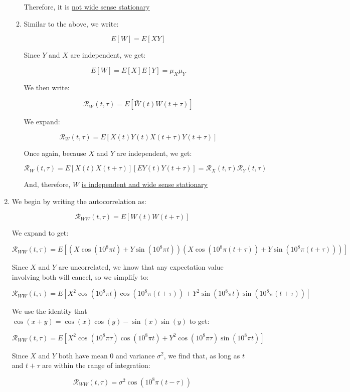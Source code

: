 \begin{enumerate}
\begin{enumerate}
        Therefore, it is \underline{not wide sense stationary}

      \item Similar to the above, we write:

        $$E[W]=E[XY]$$

        Since $Y$ and $X$ are independent, we get:

        $$E[W]=E[X]E[Y]=\mu_X\mu_Y$$

        We then write:

        $$\mathcal{R}_W(t,\tau)=E[\bar{W}(t)W(t+\tau)]$$

        We expand:

        $$\mathcal{R}_W(t,\tau)=E[X(t)Y(t)X(t+\tau)Y(t+\tau)]$$

        Once again, because $X$ and $Y$ are independent, we get:

        $$\boxed{\mathcal{R}_W(t,\tau)=E[X(t)X(t+\tau)][EY(t)Y(t+\tau)]=\mathcal{R}_X(t,\tau)\mathcal{R}_Y(t,\tau)}$$

        And, therefore, $W$ \underline{is independent and wide sense stationary}

    \end{enumerate}

  \item We begin by writing the autocorrelation as:

    $$\mathcal{R}_{WW}(t,\tau)=E[W(t)W(t+\tau)]$$

    We expand to get:

    $$\mathcal{R}_{WW}(t,\tau)=E[(X\cos(10^8\pi t)+Y\sin(10^8\pi t))(X\cos(10^8\pi(t+\tau))+Y\sin(10^8\pi(t+\tau)))]$$

    Since $X$ and $Y$ are uncorrelated, we know that any expectation value involving both will cancel, so we simplify to:

    $$\mathcal{R}_{WW}(t,\tau)=E[X^2\cos(10^8\pi t)\cos(10^8\pi(t+\tau))+Y^2\sin(10^8\pi t)\sin(10^8\pi(t+\tau))]$$

    We use the identity that $\cos(x+y)=\cos(x)\cos(y)-\sin(x)\sin(y)$ to get:

    $$\mathcal{R}_{WW}(t,\tau)=E[X^2\cos(10^8\pi \tau)\cos(10^8\pi t)+Y^2\cos(10^8\pi\tau)\sin(10^8\pi t)]$$

    Since $X$ and $Y$ both have mean 0 and variance $\sigma^2$, we find that, as long as $t$ and $t+\tau$ are within the range of integration:

    $$\boxed{\mathcal{R}_{WW}(t,\tau)=\sigma^2\cos(10^8\pi (t-\tau))}$$


\end{enumerate}
